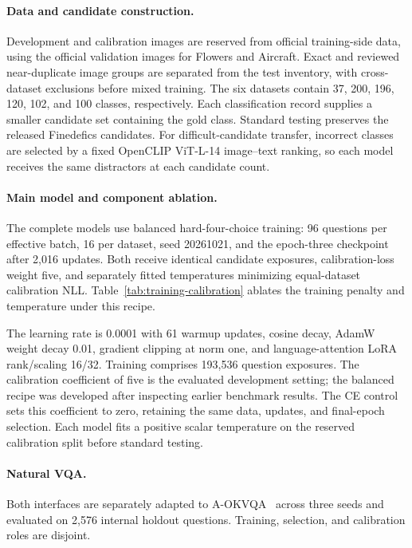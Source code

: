 \paragraph{Data and candidate construction.}
Development and calibration images are reserved from official training-side data, using the official validation images for Flowers and Aircraft. Exact and reviewed near-duplicate image groups are separated from the test inventory, with cross-dataset exclusions before mixed training. The six datasets contain 37, 200, 196, 120, 102, and 100 classes, respectively. Each classification record supplies a smaller candidate set containing the gold class. Standard testing preserves the released Finedefics candidates. For difficult-candidate transfer, incorrect classes are selected by a fixed OpenCLIP ViT-L-14 image--text ranking, so each model receives the same distractors at each candidate count.

\paragraph{Main model and component ablation.}
The complete models use balanced hard-four-choice training: 96 questions per effective batch, 16 per dataset, seed 20261021, and the epoch-three checkpoint after 2,016 updates. Both receive identical candidate exposures, calibration-loss weight five, and separately fitted temperatures minimizing equal-dataset calibration NLL. Table~\ref{tab:training-calibration} ablates the training penalty and temperature under this recipe.
\label{sec:training-calibration-protocol}

The learning rate is 0.0001 with 61 warmup updates, cosine decay, AdamW weight decay 0.01, gradient clipping at norm one, and language-attention LoRA rank/scaling 16/32. Training comprises 193,536 question exposures. The calibration coefficient of five is the evaluated development setting; the balanced recipe was developed after inspecting earlier benchmark results. The CE control sets this coefficient to zero, retaining the same data, updates, and final-epoch selection. Each model fits a positive scalar temperature on the reserved calibration split before standard testing.

\paragraph{Natural VQA.}
Both interfaces are separately adapted to A-OKVQA~\citep{schwenk_2022_aokvqa} across three seeds and evaluated on 2,576 internal holdout questions. Training, selection, and calibration roles are disjoint.


